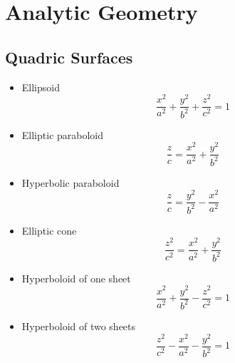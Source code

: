 \section{Analytic Geometry}

\subsection{Quadric Surfaces}
	\begin{itemize}
		\item Ellipsoid
			\begin{equation}
				\frac{x^2}{a^2} + \frac{y^2}{b^2} + \frac{z^2}{c^2} = 1
			\end{equation}
		\item Elliptic paraboloid
			\begin{equation}
				\frac{z}{c} = \frac{x^2}{a^2} + \frac{y^2}{b^2}
			\end{equation}
		\item Hyperbolic paraboloid
			\begin{equation}
				\frac{z}{c} = \frac{y^2}{b^2} - \frac{x^2}{a^2}
			\end{equation}
		\item Elliptic cone
			\begin{equation}
				\frac{z^2}{c^2} = \frac{x^2}{a^2} + \frac{y^2}{b^2}
			\end{equation}
		\item Hyperboloid of one sheet
			\begin{equation}
				\frac{x^2}{a^2} + \frac{y^2}{b^2} - \frac{z^2}{c^2} = 1
			\end{equation}
		\item Hyperboloid of two sheets
			\begin{equation}
				\frac{z^2}{c^2} - \frac{x^2}{a^2} - \frac{y^2}{b^2} = 1
			\end{equation}
	\end{itemize}
